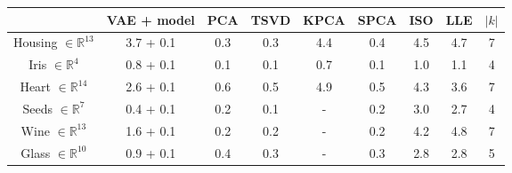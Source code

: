 \begin{tabular}{c|ccccccc|c}
                                & \textbf{VAE} + model & \textbf{PCA} & \textbf{TSVD} & \textbf{KPCA} & \textbf{SPCA} & \textbf{ISO} & \textbf{LLE} & $|k|$\\
  \hline
  
  Housing $\in \mathbb{R}^{13}$ & 3.7 + 0.1            & 0.3          & 0.3           & 4.4           & 0.4           & 4.5          & 4.7          & 7    \\
  Iris $\in \mathbb{R}^{4}$     & 0.8 + 0.1            & 0.1          & 0.1           & 0.7           & 0.1           & 1.0          & 1.1          & 4    \\
  Heart $\in \mathbb{R}^{14}$   & 2.6 + 0.1            & 0.6          & 0.5           & 4.9           & 0.5           & 4.3          & 3.6          & 7    \\
  Seeds $\in \mathbb{R}^{7}$    & 0.4 + 0.1            & 0.2          & 0.1           & -             & 0.2           & 3.0          & 2.7          & 4    \\
  Wine $\in \mathbb{R}^{13}$    & 1.6 + 0.1            & 0.2          & 0.2           & -             & 0.2           & 4.2          & 4.8          & 7    \\
  Glass $\in \mathbb{R}^{10}$   & 0.9 + 0.1            & 0.4          & 0.3           & -             & 0.3           & 2.8          & 2.8          & 5    \\
\end{tabular}